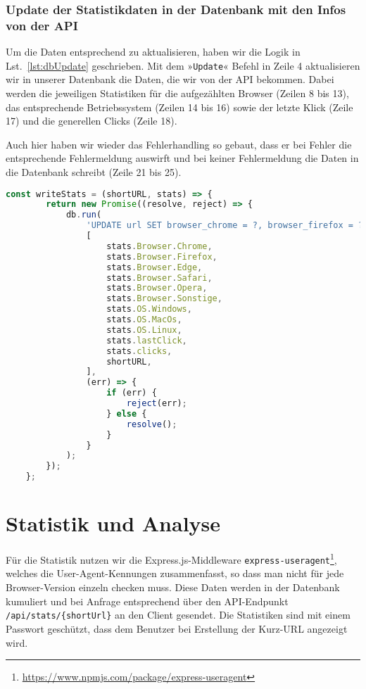 \documentclass[a4paper,11pt,DIV=12]{scrreprt}%
\begin{document}
\subsubsection{Update der Statistikdaten in der Datenbank mit den Infos von der API}
Um die Daten entsprechend zu aktualisieren, haben wir die Logik in Lst.~\ref{lst:dbUpdate} geschrieben. Mit dem »\texttt{Update}« Befehl in Zeile 4 aktualisieren wir in unserer Datenbank die Daten, die wir von der API bekommen. Dabei werden die jeweiligen Statistiken für die aufgezählten Browser (Zeilen 8 bis 13), das entsprechende Betriebssystem (Zeilen 14 bis 16) sowie der letzte Klick (Zeile 17) und die generellen Clicks (Zeile 18).

Auch hier haben wir wieder das Fehlerhandling so gebaut, dass er bei Fehler die entsprechende Fehlermeldung auswirft und bei keiner Fehlermeldung die Daten in die Datenbank schreibt (Zeile 21 bis 25).

\begin{lstlisting}[language=JavaScript,
    caption={Die Daten werden von der API an uns übermittelt und wir speichern die Daten in der Datenbank beim entsprechenden Kurzlink ab},
    label={lst:dbUpdate},
    float=h,
    gobble=4
]
    const writeStats = (shortURL, stats) => {
        return new Promise((resolve, reject) => {
            db.run(
                'UPDATE url SET browser_chrome = ?, browser_firefox = ?, browser_edge = ?, browser_safari = ?, browser_opera = ?, browser_sonstige = ?, os_win = ?, os_mac = ?, os_linux = ?, lastClick = ?, clicks = ? WHERE shortURL = ?',
                [
                    stats.Browser.Chrome,
                    stats.Browser.Firefox,
                    stats.Browser.Edge,
                    stats.Browser.Safari,
                    stats.Browser.Opera,
                    stats.Browser.Sonstige,
                    stats.OS.Windows,
                    stats.OS.MacOs,
                    stats.OS.Linux,
                    stats.lastClick,
                    stats.clicks,
                    shortURL,
                ],
                (err) => {
                    if (err) {
                        reject(err);
                    } else {
                        resolve();
                    }
                }
            );
        });
    };
\end{lstlisting}

\section{Statistik und Analyse}
Für die Statistik nutzen wir die Express.js-Middleware \texttt{express-useragent}\footnote{\href{https://www.npmjs.com/package/express-useragent}{https://www.npmjs.com/package/express-useragent}}, welches die User-Agent-Kennungen zusammenfasst, so dass man nicht für jede Browser-Version einzeln checken muss. Diese Daten werden in der Datenbank kumuliert und bei Anfrage entsprechend über den \ac{API}-Endpunkt \texttt{/api/stats/\{shortUrl\}} an den Client gesendet. Die Statistiken sind mit einem Passwort geschützt, dass dem Benutzer bei Erstellung der Kurz-URL angezeigt wird.
\end{document}

